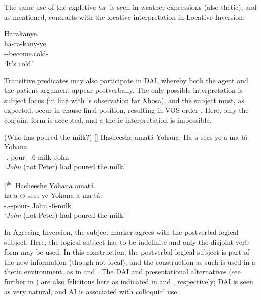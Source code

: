 \documentclass[output=paper]{langscibook}
\begin{document}
\z


The same use of the expletive \textit{ha}- is seen in weather expressions (also thetic), and as mentioned, contrasts with the locative interpretation in Locative Inversion.

\ea
Harakanye.\\
\gll
ha-ra-kany-ye\\
\EXP{}-\DJ{}-become.cold-\PFV{}\\
\glt
‘It’s cold.’\\

\z

Transitive predicates may also participate in DAI, whereby both the agent and the patient argument appear postverbally. The only possible interpretation is subject focus (in line with \citet{CarstensMletshe2015}'s observation for Xhosa), and the subject must, as expected, occur in clause-final position, resulting in VOS order . Here, only the conjoint form is accepted, and a thetic interpretation is impossible.

\ea
\label{bkm:Ref75339373}
(Who has poured the milk?)
\ea
[]{
Hasheeshe amatá Yohana.
\gll
Ha-a-sees-ye  a-ma-tá  Yohana\\
\EXP-\N.\PST{}-pour-\PFV{}  \AUG{}-6-milk  John\\
\glt
  ‘\textit{John} (not Peter) had poured the milk.’\\
}

\ex
[\textsuperscript{\#}]{
Hasheeshe  Yohana  amatá.\\
{\gll
ha-a-$\varnothing$-sees-ye  Yohana  a-ma-tá.\\
\EXP-\N.\PST-\CJ{}-pour-\PFV{} John  \AUG{}-6-milk\\}
\glt
  ‘\textit{John} (not Peter) had poured the milk.’\\
}

\z
\z

In Agreeing Inversion, the subject marker agrees with the postverbal logical subject. Here, the logical subject has to be indefinite and only the disjoint verb form may be used. In this construction, the postverbal logical subject is part of the new information (though not focal), and the construction as such is used in a thetic environment, as in  and . The DAI and presentational alternatives (see further in ) are also felicitous here as indicated in  and , respectively; DAI is seen as very natural, and AI is associated with colloquial use.
\end{document}
